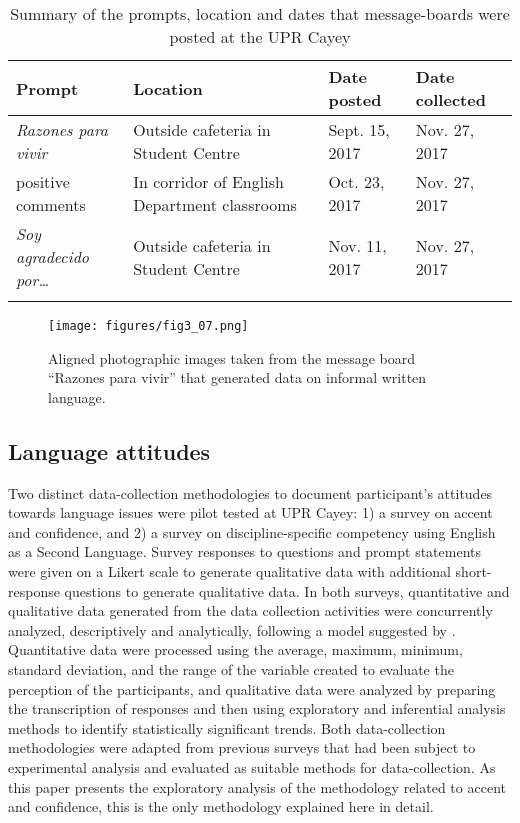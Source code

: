 \documentclass[output=paper,colorlinks,citecolor=brown]{langscibook}
\begin{document}
\begin{table}
\begin{tabularx}{\textwidth}{lQll}
    \lsptoprule
    {Prompt} & {Location} & {Date posted} & {Date collected} \\ \midrule
    \textit{Razones para   vivir} & Outside cafeteria in Student Centre & Sept. 15, 2017 & Nov. 27, 2017 \\
    positive comments & In corridor of English Department classrooms & Oct. 23, 2017 & Nov. 27, 2017 \\
    \textit{Soy agradecido por…} & Outside cafeteria in Student Centre & Nov. 11, 2017 & Nov. 27, 2017 \\ 
    \lspbottomrule
\end{tabularx}
\caption{Summary of the prompts, location and dates that message-boards were posted at the UPR Cayey}
\label{tab:tab1_07}
\end{table}

\begin{figure}
    \texttt{[image: figures/fig3\_07.png]}
    \caption{Aligned photographic images taken from the message board “Razones para vivir” that generated data on informal written language.}
    \label{fig:fig3_07}
\end{figure}

\subsection{Language attitudes}

Two distinct data-collection methodologies to document participant’s attitudes towards language issues were pilot tested at UPR Cayey: 1) a survey on accent and confidence, and 2) a survey on discipline-specific competency using English as a Second Language. Survey responses to questions and prompt statements were given on a Likert scale to generate qualitative data with additional short-response questions to generate qualitative data. In both surveys, quantitative and qualitative data generated from the data collection activities were concurrently analyzed, descriptively and analytically, following a model suggested by \citet[23--28]{Auerbach_Silverstein_2003}. Quantitative data were processed using the average, maximum, minimum, standard deviation, and the range of the variable created to evaluate the perception of the participants, and qualitative data were analyzed by preparing the transcription of responses and then using exploratory and inferential analysis methods to identify statistically significant trends. Both data-collection methodologies were adapted from previous surveys that had been subject to experimental analysis and evaluated as suitable methods for data-collection. As this paper presents the exploratory analysis of the methodology related to accent and confidence, this is the only methodology explained here in detail.
\end{document}
